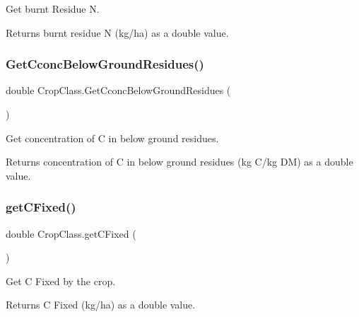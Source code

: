 Get burnt Residue N. 

\begin{DoxyReturn}{Returns}
burnt residue N (kg/ha) as a double value. 
\end{DoxyReturn}
\mbox{\label{class_crop_class_a07215b0c13fb1c87cef7cbd241fe86ca}} 
\subsubsection{\texorpdfstring{GetCconcBelowGroundResidues()}{GetCconcBelowGroundResidues()}}
{\footnotesize\ttfamily double Crop\+Class.\+Get\+Cconc\+Below\+Ground\+Residues (\begin{DoxyParamCaption}{ }\end{DoxyParamCaption})\hspace{0.3cm}{\ttfamily [inline]}}



Get concentration of C in below ground residues. 

\begin{DoxyReturn}{Returns}
concentration of C in below ground residues (kg C/kg DM) as a double value. 
\end{DoxyReturn}
\mbox{\label{class_crop_class_a7cdf534b135b2b31f0b15cb11299c73d}} 
\subsubsection{\texorpdfstring{getCFixed()}{getCFixed()}}
{\footnotesize\ttfamily double Crop\+Class.\+get\+C\+Fixed (\begin{DoxyParamCaption}{ }\end{DoxyParamCaption})\hspace{0.3cm}{\ttfamily [inline]}}



Get C Fixed by the crop. 

\begin{DoxyReturn}{Returns}
C Fixed (kg/ha) as a double value. 
\end{DoxyReturn}
\mbox{\label{class_crop_class_aace04a8772eaabd16c1cc6f2eef90188}} 
